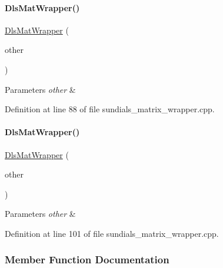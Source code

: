 \paragraph{\texorpdfstring{DlsMatWrapper()}{DlsMatWrapper()}\hspace{0.1cm}{\footnotesize\ttfamily [3/4]}}
{\footnotesize\ttfamily \mbox{\hyperlink{classamici_1_1_dls_mat_wrapper}{Dls\+Mat\+Wrapper}} (\begin{DoxyParamCaption}\item[{const \mbox{\hyperlink{classamici_1_1_dls_mat_wrapper}{Dls\+Mat\+Wrapper}} \&}]{other }\end{DoxyParamCaption})}


\begin{DoxyParams}{Parameters}
{\em other} & \\
\hline
\end{DoxyParams}


Definition at line 88 of file sundials\+\_\+matrix\+\_\+wrapper.\+cpp.

\mbox{\label{classamici_1_1_dls_mat_wrapper_a2dc462ec3b73f15fabb1c010976b9377}} 
\paragraph{\texorpdfstring{DlsMatWrapper()}{DlsMatWrapper()}\hspace{0.1cm}{\footnotesize\ttfamily [4/4]}}
{\footnotesize\ttfamily \mbox{\hyperlink{classamici_1_1_dls_mat_wrapper}{Dls\+Mat\+Wrapper}} (\begin{DoxyParamCaption}\item[{\mbox{\hyperlink{classamici_1_1_dls_mat_wrapper}{Dls\+Mat\+Wrapper}} \&\&}]{other }\end{DoxyParamCaption})\hspace{0.3cm}{\ttfamily [noexcept]}}


\begin{DoxyParams}{Parameters}
{\em other} & \\
\hline
\end{DoxyParams}


Definition at line 101 of file sundials\+\_\+matrix\+\_\+wrapper.\+cpp.



\subsubsection{Member Function Documentation}
\mbox{\label{classamici_1_1_dls_mat_wrapper_a2eb473e18629e3a3890c9d2e65798f8d}} 
